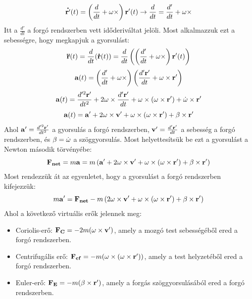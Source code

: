 \documentclass[../main.tex]{subfiles}
\begin{document}
\begin{equation}
    \bold{\dot{r'}}(t) = \left(\frac{d}{dt} + \bold{\omega} \times \right)\bold{r'}(t) \rightarrow \frac{d}{dt} = \frac{d'}{dt} + \bold{\omega} \times
\end{equation}
Itt a $\frac{d'}{dt}$ a forgó rendszerben vett időderiváltat jelöli. Most alkalmazzuk ezt a sebességre, hogy megkapjuk a gyorsulást:
\begin{equation}
    \bold{\ddot{r}}(t) = \frac{d}{dt}(\bold{\dot{r}}(t)) = \frac{d}{dt}\left(\left(\frac{d'}{dt} + \bold{\omega} \times \right)\bold{r'}(t)\right)
\end{equation}
\begin{equation}
    \bold{a}(t) = \left(\frac{d'}{dt} + \bold{\omega} \times \right)\left(\frac{d'\bold{r'}}{dt} + \bold{\omega} \times \bold{r'} \right)
\end{equation}
\begin{equation}
    \bold{a}(t) = \frac{d'^2\bold{r'}}{dt^2} + 2\bold{\omega} \times \frac{d'\bold{r'}}{dt} + \bold{\omega} \times (\bold{\omega} \times \bold{r'}) + \dot{\bold{\omega}} \times \bold{r'}
\end{equation}
\begin{equation}
    \bold{a}(t) = \bold{a'} + 2\bold{\omega} \times \bold{v'} + \bold{\omega} \times (\bold{\omega} \times \bold{r'}) + \bold{\beta} \times \bold{r'}
\end{equation}
Ahol $\bold{a'} = \frac{d'^2\bold{r'}}{dt^2}$ a gyorsulás a forgó rendszerben, $\bold{v'} = \frac{d'\bold{r'}}{dt}$ a sebesség a forgó rendszerben, és $\bold{\beta} = \dot{\bold{\omega}}$ a szöggyorsulás. Most helyettesítsük be ezt a gyorsulást a Newton második törvényébe:
\begin{equation}
    \bold{F_{net}} = m\bold{a} = m\left(\bold{a'} + 2\bold{\omega} \times \bold{v'} + \bold{\omega} \times (\bold{\omega} \times \bold{r'}) + \bold{\beta} \times \bold{r'}\right)
\end{equation}
Most rendezzük át az egyenletet, hogy a gyorsulást a forgó rendszerben kifejezzük:
\begin{equation}
    m\bold{a'} = \bold{F_{net}} - m\left(2\bold{\omega} \times \bold{v'} + \bold{\omega} \times (\bold{\omega} \times \bold{r'}) + \bold{\beta} \times \bold{r'}\right)
\end{equation}
Ahol a következő virtuális erők jelennek meg:
\begin{itemize}
    \item Coriolis-erő: $\bold{F_{C}} = -2m(\bold{\omega} \times \bold{v'})$, amely a mozgó test sebességéből ered a forgó rendszerben.
    \item Centrifugális erő: $\bold{F_{cf}} = -m(\bold{\omega} \times (\bold{\omega} \times \bold{r'}))$, amely a test helyzetéből ered a forgó rendszerben.
    \item Euler-erő: $\bold{F_{E}} = -m(\bold{\beta} \times \bold{r'})$, amely a forgás szöggyorsulásából ered a forgó rendszerben.
\end{itemize}
\end{document}
